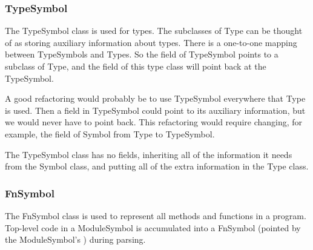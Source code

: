 \documentclass[10pt]{article}
\begin{document}
\subsubsection{TypeSymbol}
\label{sec:typesymbol}

The TypeSymbol class is used for types.  The subclasses of Type can be
thought of as storing auxiliary information about types.  There is a
one-to-one mapping between TypeSymbols and Types.  So the 
field of TypeSymbol points to a subclass of Type, and the 
field of this type class will point back at the TypeSymbol.

A good refactoring would probably be to use TypeSymbol everywhere that
Type is used.  Then a field in TypeSymbol could point to its auxiliary
information, but we would never have to point back.  This refactoring
would require changing, for example, the  field of Symbol
from Type to TypeSymbol.

The TypeSymbol class has no fields, inheriting all of the information
it needs from the Symbol class, and putting all of the extra
information in the Type class.

\subsubsection{FnSymbol}
\label{sec:fnsymbol}

The FnSymbol class is used to represent all methods and functions in a
program.  Top-level code in a ModuleSymbol is accumulated into a FnSymbol
(pointed by the ModuleSymbol's )
during parsing.
\end{document}
